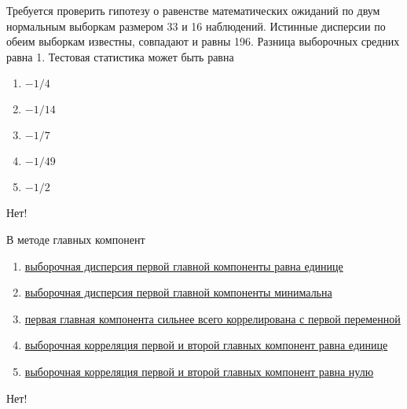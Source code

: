 \documentclass[t]{beamer}
\begin{document}
 \begin{frame} \label{10-No} 
\begin{block}{10} 

  Требуется проверить гипотезу о равенстве математических ожиданий по двум нормальным выборкам размером 33 и 16 наблюдений. Истинные дисперсии по обеим выборкам известны, совпадают и равны 196. Разница выборочных средних равна 1. Тестовая статистика может быть равна


 \end{block} 
\begin{enumerate} 
\item[] \hyperlink{10-No}{\beamergotobutton{} $-1/4$}
\item[] \hyperlink{10-No}{\beamergotobutton{} $-1/14$}
\item[] \hyperlink{10-No}{\beamergotobutton{} $-1/7$}
\item[] \hyperlink{10-No}{\beamergotobutton{} $-1/49$}
\item[] \hyperlink{10-Yes}{\beamergotobutton{} $-1/2$}
\end{enumerate} 

 \alert{Нет!} 
\end{frame} 


 \begin{frame} \label{11-No} 
\begin{block}{11} 

  В методе главных компонент


 \end{block} 
\begin{enumerate} 
\item[] \hyperlink{11-No}{\beamergotobutton{} выборочная дисперсия первой главной компоненты равна единице }
\item[] \hyperlink{11-No}{\beamergotobutton{} выборочная дисперсия первой главной компоненты минимальна}
\item[] \hyperlink{11-No}{\beamergotobutton{} первая главная компонента сильнее всего коррелирована с первой переменной}
\item[] \hyperlink{11-No}{\beamergotobutton{} выборочная корреляция первой и второй главных компонент равна единице}
\item[] \hyperlink{11-Yes}{\beamergotobutton{} выборочная корреляция первой и второй главных компонент равна нулю}
\end{enumerate} 

 \alert{Нет!} 
\end{frame} 
\end{document}
